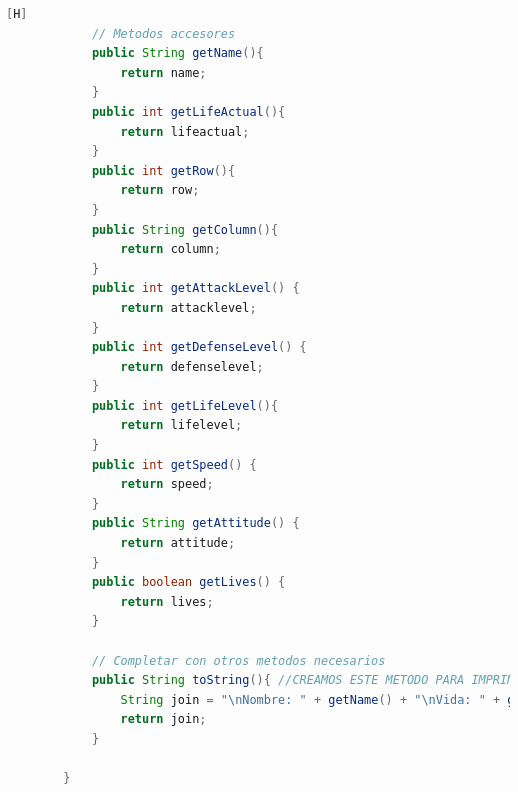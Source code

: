 \documentclass{article}
\begin{document}
\begin{lstlisting}[language=java,caption={Las lineas de codigos de la clase Soldado creada:}][H]
			// Metodos accesores
			public String getName(){
				return name;
			}
			public int getLifeActual(){
				return lifeactual;
			}
			public int getRow(){
				return row;
			}
			public String getColumn(){
				return column;
			}
			public int getAttackLevel() {
				return attacklevel;
			}
			public int getDefenseLevel() {
				return defenselevel;
			}
			public int getLifeLevel(){
				return lifelevel;
			}
			public int getSpeed() {
				return speed;
			}
			public String getAttitude() {
				return attitude;
			}
			public boolean getLives() {
				return lives;
			}
		
			// Completar con otros metodos necesarios
			public String toString(){ //CREAMOS ESTE METODO PARA IMPRIMIR LOS DATOS DEl OBJETO
				String join = "\nNombre: " + getName() + "\nVida: " + getLifeActual() + "\nFila: " + getRow() + "\nColumna: " + getColumn() + "\nNivel de ataque: " + getAttackLevel() + "\nNivel de Defensa: " + getDefenseLevel() + "\nNivel de vida: " + getLifeLevel() + "\nVelocidad: " + getSpeed() + "\nActitud: " + getAttitude() + "\nEstado: " + getLives(); //Agregamos un espaciador para poder separar
				return join;
			}
			
		}
	\end{lstlisting}
\end{document}
